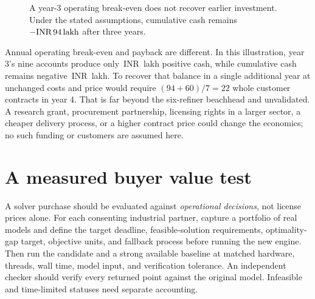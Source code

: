 \documentclass[11pt,a4paper]{article}
\newcommand{\inr}{\ifmmode\text{INR}\,\else INR\,\fi}
\newcommand{\lac}{\ifmmode\,\text{lakh}\else\,lakh\fi}
\begin{document}
\begin{figure}[htbp]
\centering
{}
\caption{A year-3 operating break-even does not recover earlier investment. Under the stated assumptions, cumulative cash remains \(-\inr94\lac{}\) after three years.}
\label{fig:cash}
\end{figure}

Annual operating break-even and payback are different. In this illustration, year 3's nine accounts produce only \inr3\lac{} positive cash, while cumulative cash remains negative \inr94\lac{}. To recover that balance in a single additional year at unchanged costs and price would require \((94+60)/7=22\) whole customer contracts in year 4. That is far beyond the six-refiner beachhead and unvalidated. A research grant, procurement partnership, licensing rights in a larger sector, a cheaper delivery process, or a higher contract price could change the economics; no such funding or customers are assumed here.

\section{A measured buyer value test}

A solver purchase should be evaluated against \emph{operational decisions}, not license prices alone. For each consenting industrial partner, capture a portfolio of real models and define the target deadline, feasible-solution requirements, optimality-gap target, objective units, and fallback process before running the new engine. Then run the candidate and a strong available baseline at matched hardware, threads, wall time, model input, and verification tolerance. An independent checker should verify every returned point against the original model. Infeasible and time-limited statuses need separate accounting.
\end{document}
